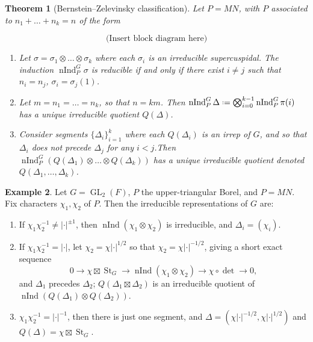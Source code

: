 \documentclass[11pt]{report}
\newcommand{\1}{\mathbbm 1}
\newcommand*{\defeq}{\mathrel{\vcenter{\baselineskip0.5ex \lineskiplimit0pt
      \hbox{\scriptsize.}\hbox{\scriptsize.}}}%
  =}
\DeclareMathOperator{\nInd}{nInd}
\DeclareMathOperator{\St}{St}
\DeclareMathOperator{\GL}{GL}
\theoremstyle{plain}
\newtheorem{thm}{Theorem}[section]
\newcounter{ex}
\theoremstyle{definition}
\newtheorem{example}[thm]{Example}
\theoremstyle{remark}
\numberwithin{equation}{section}
\begin{document}
\begin{thm}[Bernstein--Zelevinsky classification]
  Let $P = MN$, with $P$ associated to $n_{1} + \ldots + n_{k} = n$ of the form

  \begin{equation}
    \text{(Insert block diagram here)}
  \end{equation}
  \begin{enumerate}
  \item Let $\sigma = \sigma_{1}\otimes \ldots \otimes \sigma_{k}$ where each
    $\sigma_{i}$ is an irreducible supercuspidal. The induction
    $\nInd^{G}_{P} \sigma$ is reducible if and only if there exist
    $i\ne j$ such that $n_{i} = n_{j}$, $\sigma_{i} = \sigma_{j}(1)$. 
  \item Let $m = n_{1} = \ldots = n_{k}$, so that $n = km$. Then
    $\nInd_{P}^{G} \Delta \defeq \bigotimes_{i=0}^{k-1} \nInd_{P}^{G}\pi(i)$ has a unique
    irreducible quotient $Q(\Delta)$.
  \item Consider segments $\{\Delta_{i}\}_{i=1}^{k}$ where each
    $Q(\Delta_{i})$ is an irrep of $G$, and so that $\Delta_{i}$ does not
    precede $\Delta_{j}$ for any $i < j$.Then $\nInd_{P}^{G}(Q(\Delta_{1})\otimes \ldots \otimes Q(\Delta_{k}))$ has a unique irreducible quotient denoted $Q(\Delta_{1},\ldots, \Delta_{k})$. 
  \end{enumerate}
\end{thm}

\begin{example}
  Let $G = \GL_{2}(F)$, $P$ the upper-triangular Borel, and $P =
  MN$. Fix characters $\chi_{1},\chi_{2}$ of $P$. Then the irreducible
  representations of $G$ are:
  \begin{enumerate}
  \item If $\chi_{1}\chi^{-1}_{2} \ne |{\cdot}|^{\pm 1}$, then
    $\nInd(\chi_{1}\otimes \chi_{2})$ is irreducible, and $\Delta_{i} = (\chi_{i})$.
  \item If $\chi_{1}\chi_{2}^{-1} = |{\cdot}|$, let
    $\chi_{2} = \chi |{\cdot}|^{1/2}$ so that $\chi_{2} = \chi |{\cdot}|^{-1/2} $, giving a short exact sequence
    \begin{equation}
      0 \to \chi \boxtimes \St_{G} \to \nInd(\chi_{1}\otimes \chi_{2}) \to \chi \circ \det \to 0,
    \end{equation}
    and $\Delta_{1}$ precedes $\Delta_{2}$;
    $Q(\Delta_{1}\boxtimes \Delta_{2})$ is an irreducible quotient of
    $\nInd(Q(\Delta_{1})\otimes Q(\Delta_{2}))$.
  \item $\chi_{1}\chi_{2}^{-1}= |{\cdot}|^{-1}$, then there is just one segment,
    and $\Delta= (\chi|{\cdot}|^{-1/2}, \chi|{\cdot}|^{1/2})$ and $Q(\Delta) = \chi \boxtimes \St_{G}$.
  \end{enumerate}
\end{example}
\end{document}
